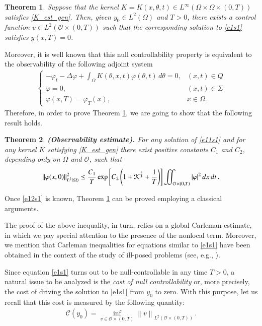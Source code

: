 \documentclass[preprint,1p]{elsarticle}
\newcommand{\D}{\displaystyle}
\newcommand{\norm}[2]{\left\|#1\right\|_{#2}}
\newcommand{\intd}{\displaystyle\int \kern -7pt \int}
\newtheorem{theorem}{\bf Theorem}[section]
\begin{document}
\begin{theorem}\label{control_thm} 
Suppose that the kernel $K=K(x,\theta,t)\in L^\infty(\Omega\times\Omega\times(0,T))$ satisfies \eqref{K_est_gen}. Then, given $y_0\in L^2(\Omega)$ and $T>0$, there exists a control function $v\in L^2(\mathcal{O}\times (0,T))$ such that the corresponding solution to \eqref{e1s1} satisfies $y(x,T)=0$.
\end{theorem}

Moreover, it is well known that this null controllability property is equivalent to the observability of the following adjoint system
\begin{align}\label{e11s1}
	\begin{cases}
		\D-\varphi_t-\Delta\varphi + \int_\Omega K(\theta,x,t)\varphi(\theta,t)\,d\theta = 0, & (x,t)\in Q
		\\
		\varphi = 0, & (x,t)\in \Sigma
		\\
		\varphi(x,T) = \varphi_T(x), & x\in \Omega.
	\end{cases}
\end{align}
Therefore, in order to prove Theorem \ref{control_thm}, we are going to show that the following result holds.

\begin{theorem}\label{th2s1} {\bf(Observability estimate).}
	For any solution of \eqref{e11s1} and for any kernel $K$ satisfying \eqref{K_est_gen} there exist positive constants $C_1$ and $C_2$, depending only on $\Omega$ and $\mathcal O$, such that 
	\begin{align}\label{e12s1}
		\norm{\varphi(x,0)}{L^2(\Omega)}^2 \leq \frac{C_1}{T} \exp\left[C_2\left(1 + \mathcal{K}^{\frac 23} +\frac
	1T \right)\right] \intd_{{ \mathcal O}\times(0,T)}|\varphi|^{2}\,dx\,dt\,.
	\end{align}
\end{theorem}
Once \eqref{e12s1} is known, Theorem \ref{control_thm} can be proved employing a classical arguments. 

The proof of the above inequality, in turn, relies on a global Carleman estimate, in which we pay special attention to the presence of the nonlocal term. Moreover, we mention that Carleman inequalities for equations similar to \eqref{e1s1} have been obtained in the context of the study of ill-posed problems (see, e.g., \cite{lorenzi2011two}). 

Since equation \eqref{e1s1} turns out to be null-controllable in any time $T>0$, a natural issue to be analyzed is the {\it cost of null controllability} or, more precisely, the cost of driving the solution to \eqref{e1s1} from $y_0$ to zero. With this purpose, let us recall that this cost is measured by the following quantity:
%
\begin{align}\label{cost}
	\mathcal C(y_0)=\D\inf_{v\in{\mathcal O\times(0,T)}}\norm{v}{L^2(\mathcal O\times(0,T))}\,.
\end{align}
\end{document}
